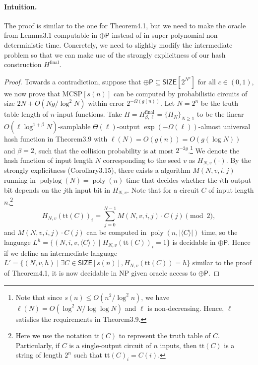 \paragraph{Intuition.} The proof is similar to the one for Theorem4.1, but we need to make the oracle from Lemma3.1 computable in $\oplus\mathsf P$ instead of in super-polynomial non-deterministic time. Concretely, we need to slightly modify the intermediate problem so that we can make use of the strongly explicitness of our hash construction $H^{\mathrm{final}}$.
\begin{proof}
Towards a contradiction, suppose that $\oplus\mathsf P\subseteq\mathsf{SIZE}[2^{N^c}]$ for all $c\in(0,1)$, we now prove that $\mathrm{MCSP}[s(n)]$ can be computed by probabilistic circuits of size $2N+O(Ng/\log^2N)$ within error $2^{-\Omega(g(n))}$.
Let $N=2^n$ be the truth table length of $n$-input functions. Take $H=H^{\mathrm{final}}_{\beta,\ell}=\{H_N\}_{N\ge1}$ to be the linear $O(\ell\log^{1+\beta}N)$-samplable $\Theta(\ell)$-output $\exp(-\Omega(\ell))$-almost universal hash function in Theorem3.9 with $\ell(N)=O(g(n))=O(g(\log N))$ and $\beta=2$, such that the collision probability is at most $2^{-2g}$.\footnote{Note that since $s(n)\le O(n^2/\log^2n)$, we have $\ell(N)=O(\log^2N/\log\log N)$ and $\ell$ is non-decreasing. Hence, $\ell$ satisfies the requirements in Theorem3.9.}
We denote the hash function of input length $N$ corresponding to the seed $v$ as $H_{N,v}(\cdot)$. By the strongly explicitness (Corollary3.15), there exists a algorithm $M(N,v,i,j)$ running in $\operatorname{polylog}(N)=\operatorname{poly}(n)$ time that decides whether the $i$th output bit depends on the $j$th input bit in $H_{N,v}$. Note that for a circuit $C$ of input length $n$,\footnote{Here we use the notation $\mathrm{tt}(C)$ to represent the truth table of $C$. Particularly, if $C$ is a single-output circuit of $n$ inputs, then $\mathrm{tt}(C)$ is a string of length $2^n$ such that $\mathrm{tt}(C)_i=C(i)$.}
\[H_{N,v}(\mathrm{tt}(C))_i=\sum_{j=0}^{N-1}M(N,v,i,j)\cdot C(j)\pmod2,\]
and $M(N,v,i,j)\cdot C(j)$ can be computed in $\operatorname{poly}(n,|\langle C\rangle|)$ time, so the language $L^h=\{(N,i,v,\langle C\rangle)\mid H_{N,v}(\mathrm{tt}(C))_i=1\}$ is decidable in $\oplus\mathsf P$. Hence if we define an intermediate language $L'=\{(N,v,h)\mid\exists C\in\mathsf{SIZE}[s(n)],H_{N,v}(\mathrm{tt}(C))=h\}$ similar to the proof of Theorem4.1, it is now decidable in NP given oracle access to $\oplus\mathsf P$.

\end{proof}
